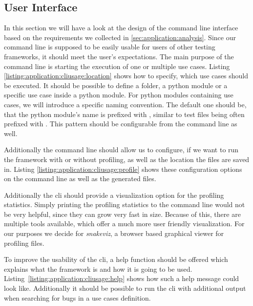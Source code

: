 \subsection{User Interface}

In this section we will have a look at the design of the command line interface
based on the requirements we collected in \ref{sec:application:analysis}. Since
our command line is supposed to be easily usable for users of other testing
frameworks, it should meet the user's expectations. The main purpose of the
command line is starting the execution of one or multiple use cases. Listing
\ref{listing:application:cliusage:location} shows how to specify, which use
cases should be executed. It should be possible to define a folder, a python
module or a specific use case inside a python module. For python modules
containing use cases, we will introduce a specific naming convention. The
default one should be, that the python module's name is prefixed with
, similar to test files being often prefixed with
. This pattern should be configurable from the
command line as well.



Additionally the command line should allow us to configure, if we want to run
the framework with or without profiling, as well as the location the files are
saved in. Listing \ref{listing:application:cliusage:profile} shows these
configuration options on the command line as well as the generated files.



Additionally the \gls{cli} should provide a visualization option for the
profiling statistics. Simply printing the profiling statistics to the command
line would not be very helpful, since they can grow very fast in size. Because
of this, there are multiple tools available, which offer a much more user
friendly visualization. For our purposes we decide for \emph{snakeviz}, a
browser based graphical viewer for profiling files.  \cite{Snakeviz}

To improve the usability of the \gls{cli}, a help function should be offered
which explains what the framework is and how it is going to be used.
Listing \ref{listing:application:cliusage:help} shows how such a help message
could look like. Additionally it should be possible to run the \gls{cli} with
additional output when searching for bugs in a use cases definition. 

